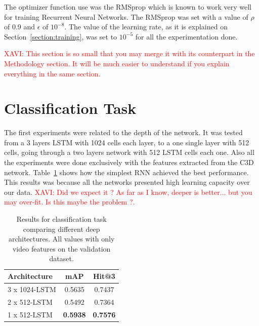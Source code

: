 The optimizer function use was the RMSprop\cite{dauphin2015rmsprop} which is known to work very well for training Recurrent Neural Networks. The RMSprop was set with a value of $\rho$ of 0.9 and $\epsilon$ of $10^{-8}$. The value of the learning rate, as it is explained on Section~\ref{section:training}, was set to $10^{-5}$ for all the experimentation done. 


\textcolor{red}{XAVI: This section is so small that you may merge it with its counterpart in the Methodology section. It will be much easier to understand if you explain everything in the same section. }

\section{Classification Task}

The first experiments were related to the depth of the network. 
It was tested from a 3 layers LSTM with 1024 cells each layer, to a one single layer with 512 cells, going through a two layers network with 512 LSTM cells each one. 
Also all the experiments were done exclusively with the features extracted from the C3D network.
Table~\ref{table:classification_by_architecture} shows how the simplest RNN achieved the best performance. This results was because all the networks presented high learning capacity over our data.
\textcolor{red}{XAVI: Did we expect it ? As far as I know, deeper is better... but you may over-fit. Is this maybe the problem ?. }

\begin{table}[H]
\begin{center}
\begin{tabular}{|l|c|c|}
\hline
Architecture & mAP & Hit@3 \\
\hline\hline
3 x 1024-LSTM & 0.5635 & 0.7437 \\
2 x 512-LSTM & 0.5492 & 0.7364 \\
1 x 512-LSTM & \bf0.5938 & \bf0.7576 \\
\hline
\end{tabular}
\end{center}
\caption{Results for classification task comparing different deep architectures. All values with
         only video features on the validation dataset.}
\label{table:classification_by_architecture}
\end{table}

